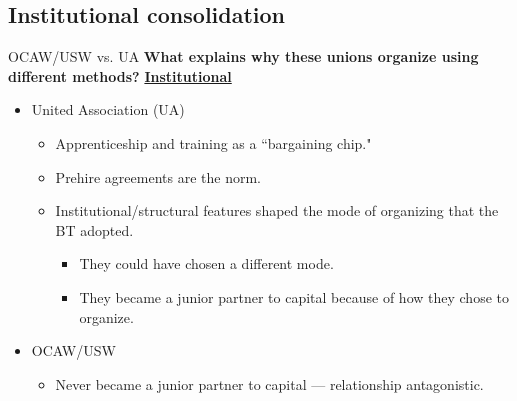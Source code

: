 \documentclass{beamer}
\begin{document}
\subsection*{Institutional consolidation}
\begin{frame}{OCAW/USW vs. UA}
\textbf{What explains why these unions organize using different methods?}\newline\newline
\underline{\textbf{Institutional}}
	\begin{itemize}
		\item United Association (UA)
			\begin{itemize}
				\item Apprenticeship and training as a ``bargaining chip."
				\item Prehire agreements are the norm.
				\item Institutional/structural features shaped the mode of organizing that the BT adopted.
				\begin{itemize}
					\item They could have chosen a different mode.
					\item They became a junior partner to capital because of how they chose to organize.
				\end{itemize}
	\end{itemize}
		\item OCAW/USW
		\begin{itemize}
			\item Never became a junior partner to capital — relationship antagonistic.
		\end{itemize}
	\end{itemize}
\end{frame}
\end{document}
